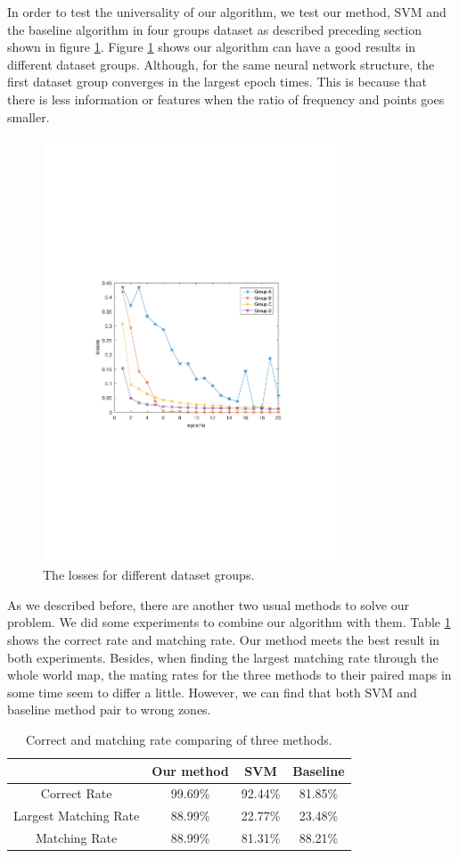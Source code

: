 In order to test the universality of our algorithm, we test our method, SVM and the baseline algorithm in four groups dataset as described preceding section shown in figure \ref{fig:group_results}. Figure \ref{fig:group_results} shows our algorithm can have a good results in different dataset groups. Although, for the same neural network structure, the first dataset group converges in the largest epoch times. This is because that there is less information or features when the ratio of frequency and points goes smaller.
\begin{figure}[!t]
	\centering
	\includegraphics[width=3.5in]{figures/group_results}
	\caption{The losses for different dataset groups.}
	\label{fig:group_results}
\end{figure}

As we described before, there are another two usual methods to solve our problem. We did some experiments to combine our algorithm with them. Table \ref{tab:methods} shows the correct rate and matching rate. Our method meets the best result in both experiments. Besides, when finding the largest matching rate through the whole world map, the mating rates for the three methods to their paired maps in some time seem to differ a little. However, we can find that both SVM and baseline method pair to wrong zones.
\begin{table}[!t]
	\renewcommand{\arraystretch}{1.3}
	\caption{Correct and matching rate comparing of three methods.}
	\label{tab:methods}
	\centering
	\begin{tabular}{c|ccc}
		\hline
		& Our method & SVM & Baseline \\
		\hline
		Correct Rate & 99.69\% & 92.44\% & 81.85\% \\
		\hline
		Largest Matching Rate & 88.99\% & 22.77\% & 23.48\% \\
		\hline
		Matching Rate & 88.99\% & 81.31\% & 88.21\% \\
		\hline
	\end{tabular}
\end{table}

